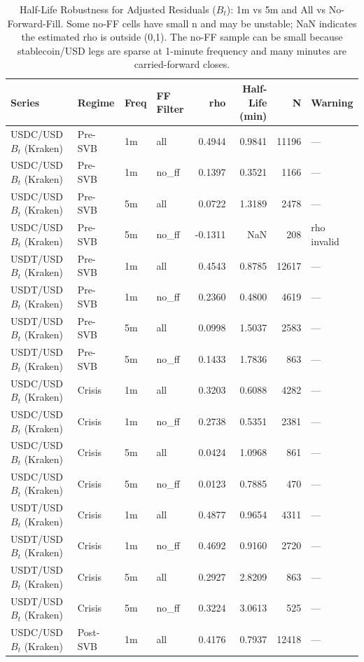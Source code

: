 \begin{table}[H]
\caption{Half-Life Robustness for Adjusted Residuals ($B_t$): 1m vs 5m and All vs No-Forward-Fill. Some no-FF cells have small n and may be unstable; NaN indicates the estimated rho is outside (0,1). The no-FF sample can be small because stablecoin/USD legs are sparse at 1-minute frequency and many minutes are carried-forward closes.}
\label{tab:half_life_robustness}
\begin{tabular}{llllrrrl}
\toprule
Series & Regime & Freq & FF Filter & rho & Half-Life (min) & N & Warning \\
\midrule
USDC/USD $B_t$ (Kraken) & Pre-SVB & 1m & all & 0.4944 & 0.9841 & 11196 & — \\
USDC/USD $B_t$ (Kraken) & Pre-SVB & 1m & no_ff & 0.1397 & 0.3521 & 1166 & — \\
USDC/USD $B_t$ (Kraken) & Pre-SVB & 5m & all & 0.0722 & 1.3189 & 2478 & — \\
USDC/USD $B_t$ (Kraken) & Pre-SVB & 5m & no_ff & -0.1311 & NaN & 208 & rho invalid \\
USDT/USD $B_t$ (Kraken) & Pre-SVB & 1m & all & 0.4543 & 0.8785 & 12617 & — \\
USDT/USD $B_t$ (Kraken) & Pre-SVB & 1m & no_ff & 0.2360 & 0.4800 & 4619 & — \\
USDT/USD $B_t$ (Kraken) & Pre-SVB & 5m & all & 0.0998 & 1.5037 & 2583 & — \\
USDT/USD $B_t$ (Kraken) & Pre-SVB & 5m & no_ff & 0.1433 & 1.7836 & 863 & — \\
USDC/USD $B_t$ (Kraken) & Crisis & 1m & all & 0.3203 & 0.6088 & 4282 & — \\
USDC/USD $B_t$ (Kraken) & Crisis & 1m & no_ff & 0.2738 & 0.5351 & 2381 & — \\
USDC/USD $B_t$ (Kraken) & Crisis & 5m & all & 0.0424 & 1.0968 & 861 & — \\
USDC/USD $B_t$ (Kraken) & Crisis & 5m & no_ff & 0.0123 & 0.7885 & 470 & — \\
USDT/USD $B_t$ (Kraken) & Crisis & 1m & all & 0.4877 & 0.9654 & 4311 & — \\
USDT/USD $B_t$ (Kraken) & Crisis & 1m & no_ff & 0.4692 & 0.9160 & 2720 & — \\
USDT/USD $B_t$ (Kraken) & Crisis & 5m & all & 0.2927 & 2.8209 & 863 & — \\
USDT/USD $B_t$ (Kraken) & Crisis & 5m & no_ff & 0.3224 & 3.0613 & 525 & — \\
USDC/USD $B_t$ (Kraken) & Post-SVB & 1m & all & 0.4176 & 0.7937 & 12418 & — \\

\end{tabular}
\end{table}

